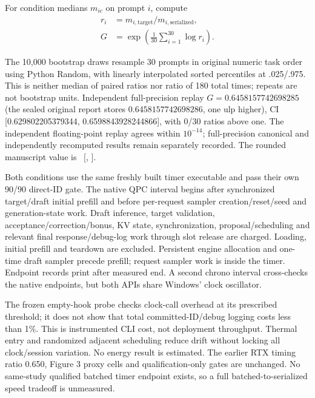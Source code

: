 \begin{samepage}
For condition medians $m_{ic}$ on prompt $i$, compute
\[
\begin{aligned}
r_i&=m_{i,\mathrm{target}}/m_{i,\mathrm{serialized}},\\
G&=\exp\!\left(\frac1{30}\sum_{i=1}^{30}\log r_i\right).
\end{aligned}
\]
\end{samepage}
The 10,000 bootstrap draws resample 30 prompts in original numeric task order using Python Random, with linearly interpolated sorted percentiles at .025/.975. This is neither median of paired ratios nor ratio of 180 total times; repeats are not bootstrap units. Independent full-precision replay $G=0.6458157742698285$ (the sealed original report stores $0.6458157742698286$, one ulp higher), CI [0.629802205379344, 0.6598843928244866], with 0/30 ratios above one. The independent floating-point replay agrees within $10^{-14}$; full-precision canonical and independently recomputed results remain separately recorded. The rounded manuscript value is \FUCost\ [\FUCostLo, \FUCostHi].

Both conditions use the same freshly built timer executable and pass their own 90/90 direct-ID gate. The native QPC interval begins after synchronized target/draft initial prefill and before per-request sampler creation/reset/seed and generation-state work. Draft inference, target validation, acceptance/correction/bonus, KV state, synchronization, proposal/scheduling and relevant final response/debug-log work through slot release are charged. Loading, initial prefill and teardown are excluded. Persistent engine allocation and one-time draft sampler precede prefill; request sampler work is inside the timer. Endpoint records print after measured end. A second chrono interval cross-checks the native endpoints, but both APIs share Windows' clock oscillator.

The frozen empty-hook probe checks clock-call overhead at its prescribed threshold; it does not show that total committed-ID/debug logging costs less than 1\%. This is instrumented CLI cost, not deployment throughput. Thermal entry and randomized adjacent scheduling reduce drift without locking all clock/session variation. No energy result is estimated. The earlier RTX timing ratio 0.650, Figure 3 proxy cells and qualification-only gates are unchanged. No same-study qualified batched timer endpoint exists, so a full batched-to-serialized speed tradeoff is unmeasured.

